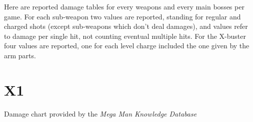 Here are reported damage tables for every weapons and every main bosses per game. For each sub-weapon two values are reported, standing for regular and charged shots (except sub-weapons which don't deal damages), and values refer to damage per single hit, not counting eventual multiple hits. For the X-buster four values are reported, one for each level charge included the one given by the arm parts.
\section{X1}
Damage chart provided by the \emph{Mega Man Knowledge Database}~\cite{wiki:damage_chart_X1}

\begin{table}[htp]
\end{table}
